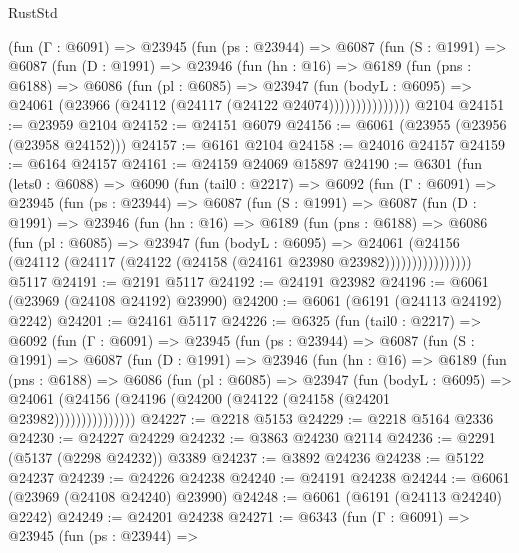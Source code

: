 \begin{lexlean}{RustStd}
\begin{coremodule}
{\begin{coremodule}
{{{{{{{{{{{{{{{{{{{{{{{{{{          (fun (Γ : @6091) =>
          @23945
            (fun (ps : @23944) =>
            @6087
              (fun (S : @1991) =>
              @6087
                (fun (D : @1991) =>
                @23946
                  (fun (hn : @16) =>
                  @6189
                    (fun (pns : @6188) =>
                    @6086
                      (fun (pl : @6085) =>
                      @23947
                        (fun (bodyL : @6095) =>
                        @24061 (@23966 (@24112 (@24117 (@24122 @24074)))))))))))))))
    @2104
@24151 := @23959 @2104
@24152 := @24151 @6079
@24156 := @6061 (@23955 (@23956 (@23958 @24152)))
@24157 := @6161 @2104
@24158 := @24016 @24157
@24159 := @6164 @24157
@24161 := @24159 @24069 @15897
@24190 := @6301
    (fun (lets0 : @6088) =>
    @6090
      (fun (tail0 : @2217) =>
      @6092
        (fun (Γ : @6091) =>
        @23945
          (fun (ps : @23944) =>
          @6087
            (fun (S : @1991) =>
            @6087
              (fun (D : @1991) =>
              @23946
                (fun (hn : @16) =>
                @6189
                  (fun (pns : @6188) =>
                  @6086
                    (fun (pl : @6085) =>
                    @23947
                      (fun (bodyL : @6095) =>
                      @24061
                        (@24156
                          (@24112 (@24117 (@24122 (@24158 (@24161 @23980 @23982))))))))))))))))
    @5117
@24191 := @2191 @5117
@24192 := @24191 @23982
@24196 := @6061 (@23969 (@24108 @24192) @23990)
@24200 := @6061 (@6191 (@24113 @24192) @2242)
@24201 := @24161 @5117
@24226 := @6325
    (fun (tail0 : @2217) =>
    @6092
      (fun (Γ : @6091) =>
      @23945
        (fun (ps : @23944) =>
        @6087
          (fun (S : @1991) =>
          @6087
            (fun (D : @1991) =>
            @23946
              (fun (hn : @16) =>
              @6189
                (fun (pns : @6188) =>
                @6086
                  (fun (pl : @6085) =>
                  @23947
                    (fun (bodyL : @6095) =>
                    @24061 (@24156 (@24196 (@24200 (@24122 (@24158 (@24201 @23982)))))))))))))))
@24227 := @2218 @5153
@24229 := @2218 @5164 @2336
@24230 := @24227 @24229
@24232 := @3863 @24230 @2114
@24236 := @2291 (@5137 (@2298 @24232)) @3389
@24237 := @3892 @24236
@24238 := @5122 @24237
@24239 := @24226 @24238
@24240 := @24191 @24238
@24244 := @6061 (@23969 (@24108 @24240) @23990)
@24248 := @6061 (@6191 (@24113 @24240) @2242)
@24249 := @24201 @24238
@24271 := @6343
    (fun (Γ : @6091) =>
    @23945
      (fun (ps : @23944) =>
}}}}}}}}}}}}}}}}}}}}}}}}}}
\end{coremodule}}
\end{coremodule}
\end{lexlean}
